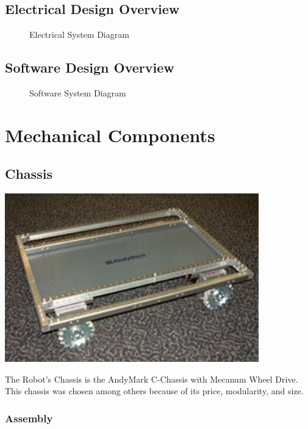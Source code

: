 \documentclass[letterpaper,12pt]{report}
\begin{document}
\section{Electrical Design Overview}
\begin{figure}[h!]
  \centering
  
  \caption{Electrical System Diagram}
  \label{fig:e_system}
\end{figure}

\section{Software Design Overview}
\begin{figure}[h!]
  \centering
  
  \caption{Software System Diagram}
  \label{fig:system_diagram}
\end{figure}

\chapter{Mechanical Components}
\section{Chassis}
\begin{center}
    \includegraphics[width=11cm]{pics/chassis/andymark_chassis.jpg}
\end{center}

The Robot's Chassis is the AndyMark C-Chassis with Mecanum Wheel Drive. This
chassis was chosen among others because of its price, modularity, and size.

\subsection{Assembly}
\end{document}
